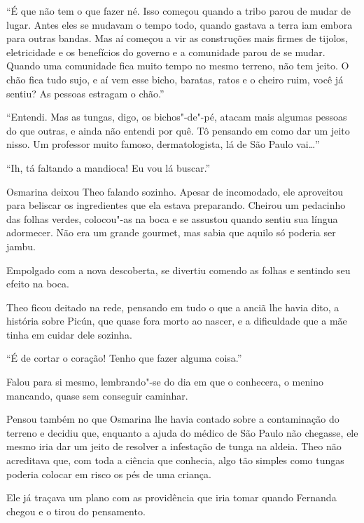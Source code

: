 ``É que não tem o que fazer né. Isso começou quando a tribo parou de
mudar de lugar. Antes eles se mudavam o tempo todo, quando gastava a
terra iam embora para outras bandas. Mas aí começou a vir as construções
mais firmes de tijolos, eletricidade e os benefícios do governo e a
comunidade parou de se mudar. Quando uma comunidade fica muito tempo no
mesmo terreno, não tem jeito. O chão fica tudo sujo, e aí vem esse
bicho, baratas, ratos e o cheiro ruim, você já sentiu? As pessoas
estragam o chão.''

``Entendi. Mas as tungas, digo, os bichos"-de"-pé, atacam mais algumas
pessoas do que outras, e ainda não entendi por quê. Tô pensando em como dar um
jeito nisso. Um professor muito famoso, dermatologista, lá de São Paulo
vai\ldots{}''

``Ih, tá faltando a mandioca! Eu vou lá buscar.''

Osmarina deixou Theo falando sozinho. Apesar de incomodado, ele
aproveitou para beliscar os ingredientes que ela estava preparando.
Cheirou um pedacinho das folhas verdes, colocou"-as na boca e se assustou
quando sentiu sua língua adormecer. Não era um grande gourmet, mas sabia
que aquilo só poderia ser jambu.

Empolgado com a nova descoberta, se divertiu comendo as folhas e
sentindo seu efeito na boca.

\asterisc


Theo ficou deitado na rede, pensando em tudo o que a anciã lhe havia
dito, a história sobre Picún, que quase fora morto ao nascer, e a
dificuldade que a mãe tinha em cuidar dele sozinha.

``É de cortar o coração! Tenho que fazer alguma coisa.''

Falou para si mesmo, lembrando"-se do dia em que o conhecera, o menino
mancando, quase sem conseguir caminhar.

Pensou também no que Osmarina lhe havia contado sobre a contaminação do
terreno e decidiu que, enquanto a ajuda do médico de São Paulo não
chegasse, ele mesmo iria dar um jeito de resolver a infestação de tunga
na aldeia. Theo não acreditava que, com toda a ciência que conhecia,
algo tão simples como tungas poderia colocar em risco os pés de uma
criança.

Ele já traçava um plano com as providência que iria tomar quando
Fernanda chegou e o tirou do pensamento.

